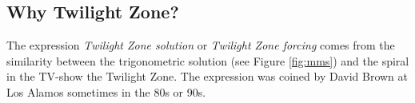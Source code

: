 \documentclass[11pt]{article}
\begin{document}
\subsection*{Why Twilight Zone?}
The expression \emph{Twilight Zone solution} or \emph{Twilight Zone forcing} comes from the similarity between the trigonometric solution (see Figure \ref{fig:mms}) and the spiral in the TV-show the Twilight Zone. The expression was coined by David Brown at Los Alamos sometimes in the 80s or 90s.   
\end{document}
